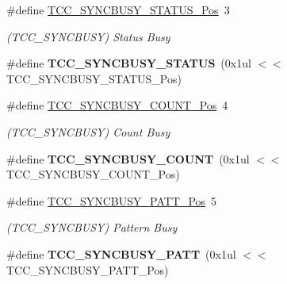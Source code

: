 \begin{DoxyCompactItemize}
\item 
\hypertarget{group___s_a_m_l21___t_c_c_ga32d8922e6688ab571968189699e4f944}{}\#define \hyperlink{group___s_a_m_l21___t_c_c_ga32d8922e6688ab571968189699e4f944}{T\+C\+C\+\_\+\+S\+Y\+N\+C\+B\+U\+S\+Y\+\_\+\+S\+T\+A\+T\+U\+S\+\_\+\+Pos}~3\label{group___s_a_m_l21___t_c_c_ga32d8922e6688ab571968189699e4f944}

\begin{DoxyCompactList}\small\item\em (T\+C\+C\+\_\+\+S\+Y\+N\+C\+B\+U\+S\+Y) Status Busy \end{DoxyCompactList}\item 
\hypertarget{group___s_a_m_l21___t_c_c_ga3b7b303c493b1e52f638516a9a5577bb}{}\#define {\bfseries T\+C\+C\+\_\+\+S\+Y\+N\+C\+B\+U\+S\+Y\+\_\+\+S\+T\+A\+T\+U\+S}~(0x1ul $<$$<$ T\+C\+C\+\_\+\+S\+Y\+N\+C\+B\+U\+S\+Y\+\_\+\+S\+T\+A\+T\+U\+S\+\_\+\+Pos)\label{group___s_a_m_l21___t_c_c_ga3b7b303c493b1e52f638516a9a5577bb}

\item 
\hypertarget{group___s_a_m_l21___t_c_c_gab831029cbae923c4e07a8ca8a9238254}{}\#define \hyperlink{group___s_a_m_l21___t_c_c_gab831029cbae923c4e07a8ca8a9238254}{T\+C\+C\+\_\+\+S\+Y\+N\+C\+B\+U\+S\+Y\+\_\+\+C\+O\+U\+N\+T\+\_\+\+Pos}~4\label{group___s_a_m_l21___t_c_c_gab831029cbae923c4e07a8ca8a9238254}

\begin{DoxyCompactList}\small\item\em (T\+C\+C\+\_\+\+S\+Y\+N\+C\+B\+U\+S\+Y) Count Busy \end{DoxyCompactList}\item 
\hypertarget{group___s_a_m_l21___t_c_c_ga54a5bca95504fe716be0b825632e06c7}{}\#define {\bfseries T\+C\+C\+\_\+\+S\+Y\+N\+C\+B\+U\+S\+Y\+\_\+\+C\+O\+U\+N\+T}~(0x1ul $<$$<$ T\+C\+C\+\_\+\+S\+Y\+N\+C\+B\+U\+S\+Y\+\_\+\+C\+O\+U\+N\+T\+\_\+\+Pos)\label{group___s_a_m_l21___t_c_c_ga54a5bca95504fe716be0b825632e06c7}

\item 
\hypertarget{group___s_a_m_l21___t_c_c_ga18118a0ecdca4567bda2d1d388ff9262}{}\#define \hyperlink{group___s_a_m_l21___t_c_c_ga18118a0ecdca4567bda2d1d388ff9262}{T\+C\+C\+\_\+\+S\+Y\+N\+C\+B\+U\+S\+Y\+\_\+\+P\+A\+T\+T\+\_\+\+Pos}~5\label{group___s_a_m_l21___t_c_c_ga18118a0ecdca4567bda2d1d388ff9262}

\begin{DoxyCompactList}\small\item\em (T\+C\+C\+\_\+\+S\+Y\+N\+C\+B\+U\+S\+Y) Pattern Busy \end{DoxyCompactList}\item 
\hypertarget{group___s_a_m_l21___t_c_c_gacde9495f48b2f0098ddb985954ebd485}{}\#define {\bfseries T\+C\+C\+\_\+\+S\+Y\+N\+C\+B\+U\+S\+Y\+\_\+\+P\+A\+T\+T}~(0x1ul $<$$<$ T\+C\+C\+\_\+\+S\+Y\+N\+C\+B\+U\+S\+Y\+\_\+\+P\+A\+T\+T\+\_\+\+Pos)\label{group___s_a_m_l21___t_c_c_gacde9495f48b2f0098ddb985954ebd485}


\end{DoxyCompactItemize}
